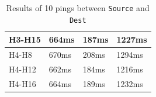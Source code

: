 \documentclass[a4paper, 11pt, oneside]{article}
\begin{document}
\begin{table}[H]
\begin{tabular}{|l|l|l|l|}
    H3-H15                                      & 664ms                              & 187ms                              & 1227ms                                 \\ \hline
    H4-H8                                    & 670ms                              & 208ms                              & 1294ms                                 \\ \hline
    H4-H12                                     & 662ms                              & 184ms                              & 1216ms                                 \\ \hline
    H4-H16                                     & 664ms                              & 189ms                              & 1232ms                                 \\ \hline
    \end{tabular}
    \caption{Results of 10 pings between \texttt{Source} and \texttt{Dest}}
    \label{table:VLANs_pings}
    \end{table}
\end{document}
